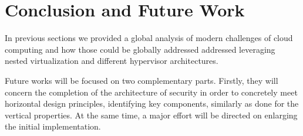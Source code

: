 \documentclass{sig-alternate}
\begin{document}
\section{Conclusion and Future Work}
\label{sec:conclu}

In previous sections we provided a global analysis of modern challenges of cloud computing  and how those could be globally addressed addressed leveraging nested virtualization and different hypervisor architectures. 

Future works will be focused on two complementary parts.
Firstly, they will concern the completion of the architecture of security in order to concretely meet horizontal design principles, identifying key components, similarly as done for the vertical properties.
At the same time, a major effort will be directed on enlarging the initial implementation.

%


%
%

{\scriptsize


}
\end{document}
